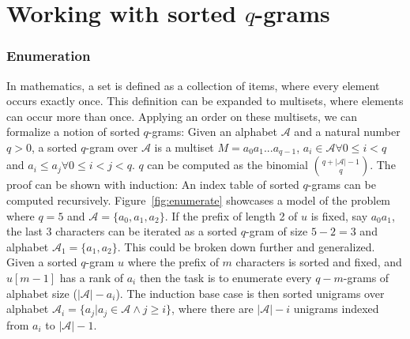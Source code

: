 \documentclass[twoside,a4paper,bsc]{master}
\newcommand{\Qgram}[1]{\(#1\)-gram}
\newcommand{\Alpha}[0]{\mathcal{A}}
\begin{document}
\section{Working with sorted \Qgram{q}s}
\subsubsection{Enumeration}
In mathematics, a set is defined as a collection of items, where every
element occurs exactly once. This definition can be expanded to multisets,
where elements can occur more than once. Applying an order on these
multisets, we can formalize a notion of sorted \Qgram{q}s:
Given an alphabet \(\Alpha\) and a natural number \(q > 0\), a sorted
\Qgram{q} over \(\Alpha\) is a multiset \(M=a_0a_1...a_{q-1}\),
\(a_i\in\mathcal{A}\forall 0\leq i<q\) and \(a_i \leq a_j\forall 0\leq i <
j < q\).
\(q\) can be computed as the binomial \(\binom{q+|\mathcal{A}|-1}{q}\). The
proof can be shown with induction:
An index table of sorted \Qgram{q}s can be computed recursively.
Figure~\ref{fig:enumerate} showcases a model of the problem where \(q=5\)
and \(\Alpha=\{a_0,a_1,a_2\}\). If the prefix of length 2 of \(u\) is
fixed, say \(a_0a_1\), the last 3 characters can be iterated as a sorted
\Qgram{q} of size \(5-2=3\) and alphabet \(\Alpha_1 = \{a_1,a_2\}\). This
could be broken down further and generalized.
Given a sorted \Qgram{q} \(u\) where the prefix of \(m\) characters is
sorted and fixed, and \(u[m-1]\) has a rank of \(a_i\) then the task is to
enumerate every \Qgram{q-m}s of alphabet size (\(|\mathcal{A}|-a_i\)).
The induction base case is then sorted unigrams over alphabet \(\Alpha_i =
\{a_j| a_j\in\Alpha \land j\geq i\}\), where there are \(|\Alpha|-i\)
unigrams indexed from \(a_i\) to \(|\Alpha|-1\).
\end{document}
